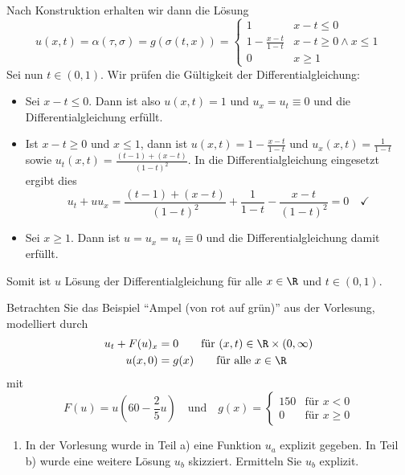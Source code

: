 \begin{exercisePage}
\begin{enumerate}[label=(zu \alph*), leftmargin=*]
	Nach Konstruktion erhalten wir dann die Lösung
	\begin{equation*}
		u(x,t) = \alpha(\tau,\sigma) = g(\sigma(t,x)) = \begin{cases}
			1                   & x - t \le 0 \\
			1 - \frac{x-t}{1-t} & x-t \ge 0 \land x \le 1 \\
			0                   & x \ge 1
		\end{cases} 
	\end{equation*}
	Sei nun $t \in (0,1)$. Wir prüfen die Gültigkeit der Differentialgleichung:
	\begin{itemize}
		\item Sei $x - t \le 0$.  Dann ist also $u(x,t) = 1$ und $u_x = u_t \equiv 0$ und die Differentialgleichung erfüllt. 
		\item Ist $x-t \ge 0$ und $x \le 1$, dann ist $u(x,t) = 1 - \frac{x-t}{1-t}$ und $u_x(x,t) = \frac{1}{1-t}$ sowie $u_t(x,t) = \frac{(t-1)+(x-t)}{(1-t)^2}$. In die Differentialgleichung eingesetzt ergibt dies
		\begin{equation*}
			u_t + u u_x = \frac{(t-1)+(x-t)}{(1-t)^2} + \frac{1}{1-t} - \frac{x-t}{(1-t)^2} = 0 \quad \checkmark
		\end{equation*}
		\item Sei $x \ge 1$. Dann ist $u = u_x = u_t \equiv 0$ und die Differentialgleichung damit erfüllt.
	\end{itemize}
	Somit ist $u$ Lösung der Differentialgleichung für alle $x \in \R$ und $t \in (0,1)$.
\end{enumerate}



\begin{task}
	Betrachten Sie das Beispiel \enquote{Ampel (von rot auf grün)} aus der Vorlesung, modelliert durch
	\begin{equation*}
		\begin{aligned}
			u_t + F(u)_x &= 0 \qquad \text{für } (x,t) \in \R \times (0,\infty) \\
			u(x,0) &= g(x) \qquad \text{für alle } x \in \R
		\end{aligned}
	\end{equation*}
	mit 
	\begin{equation*}
		F(u) = u(60 - \frac{2}{5} u)\quad \text{und} \quad g(x) = \begin{cases} 150 & \text{für } x<0 \\ 0 & \text{für } x \ge 0\end{cases}
	\end{equation*}
	\begin{enumerate}
		\item In der Vorlesung wurde in Teil a) eine Funktion $u_a$ explizit gegeben. In Teil b) wurde eine weitere Lösung $u_b$ skizziert. Ermitteln Sie $u_b$ explizit.
		

\end{enumerate}
\end{task}
\end{exercisePage}
